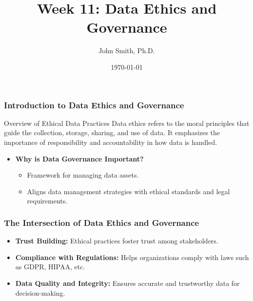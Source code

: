 \documentclass[aspectratio=169]{beamer}
\begin{document}
\frame{\titlepage}

\begin{frame}[fragile]
    \title{Week 11: Data Ethics and Governance}
    \author{John Smith, Ph.D.}
    \date{\today}
    \maketitle
\end{frame}

\begin{frame}[fragile]
    \frametitle{Introduction to Data Ethics and Governance}
    \begin{block}{Overview of Ethical Data Practices}
        Data ethics refers to the moral principles that guide the collection, storage, sharing, and use of data. It emphasizes the importance of responsibility and accountability in how data is handled.
    \end{block}
    \begin{itemize}
        \item \textbf{Why is Data Governance Important?}
        \begin{itemize}
            \item Framework for managing data assets.
            \item Aligns data management strategies with ethical standards and legal requirements.
        \end{itemize}
    \end{itemize}
\end{frame}

\begin{frame}[fragile]
    \frametitle{The Intersection of Data Ethics and Governance}
    \begin{itemize}
        \item \textbf{Trust Building:} Ethical practices foster trust among stakeholders.
        \item \textbf{Compliance with Regulations:} Helps organizations comply with laws such as GDPR, HIPAA, etc.
        \item \textbf{Data Quality and Integrity:} Ensures accurate and trustworthy data for decision-making.
    \end{itemize}
\end{frame}
\end{document}
